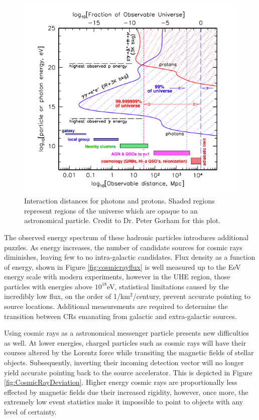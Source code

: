 \begin{figure}
\centering
	\includegraphics[width=\textwidth]{figures/ObservableUniverse}
	\caption{Interaction distances for photons and protons.  Shaded regions represent regions of the universe which are opaque to an astronomical particle. Credit to Dr. Peter Gorham for this plot.}
\label{fig:observableUniverse}
\end{figure}
	
	The observed energy spectrum of these hadronic particles introduces additional puzzles. As energy increases, the number of candidate sources for cosmic rays diminishes, leaving few to no intra-galactic candidates.\cite{RevModPhys.71.S33}  Flux density as a function of energy, shown in Figure \ref{fig:cosmicrayflux} is well measured up to the EeV energy scale with modern experiments, however in the UHE region, those particles with energies above $10^{18}$eV, statistical limitations caused by the incredibly low flux, on the order of 1/km$^2$/century, prevent accurate pointing to source locations.  Additional measurements are required to determine the transition between CRs emanating from galactic and extra-galactic sources.

	Using cosmic rays as a astronomical messenger particle presents new difficulties as well.  At lower energies, charged particles such as cosmic rays will have their courses altered by the Lorentz force while transiting the magnetic fields of stellar objects. Subsequently, inverting their incoming detection vector will no longer yield accurate pointing back to the source accelerator.  This is depicted in Figure \ref{fig:CosmicRayDeviation}.  Higher energy cosmic rays are proportionally less effected by magnetic fields due their increased rigidity, however, once more, the extremely low event statistics make it impossible to point to objects with any level of certainty. 
	
